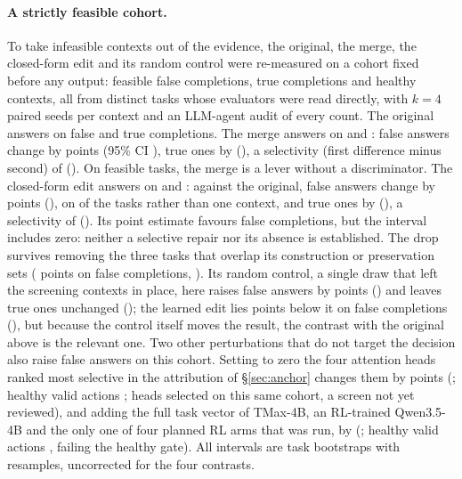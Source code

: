 \paragraph{A strictly feasible cohort.} To take infeasible contexts out of the evidence, the original, the merge, the closed-form edit and its random control were re-measured on a cohort fixed before any output: \pwOrigTasks{} feasible false completions, \pwFsm{} true completions and \pwHealthy{} healthy contexts, all from distinct tasks whose evaluators were read directly, with $k=4$ paired seeds per context and an LLM-agent audit of every count. %
The original answers on \pwOrigFsp{} false and \pwOrigFsm{} true completions. The merge answers on \pwCuaFsp{} and \pwCuaFsm: false answers change by \pwCuaDeltaFsp{} points (95\% CI \pwCuaCiFsp), true ones by \pwCuaDeltaFsm{} (\pwCuaCiFsm), a selectivity (first difference minus second) of \pwCuaSel{} (\pwCuaSelCi). On feasible tasks, the merge is a lever without a discriminator. The closed-form edit answers on \pwBroadFsp{} and \pwBroadFsm: against the original, false answers change by \pwBroadDeltaFsp{} points (\pwBroadCiFsp), on \pwBroadFspDown{} of the \pwOrigTasks{} tasks rather than one context, and true ones by \pwBroadDeltaFsm{} (\pwBroadCiFsm), a selectivity of \pwBroadSel{} (\pwBroadSelCi). Its point estimate favours false completions, but the interval includes zero: neither a selective repair nor its absence is established. The drop survives removing the three tasks that overlap its construction or preservation sets (\pwBroadSensDeltaFsp{} points on \pwSensFsp{} false completions, \pwBroadSensCiFsp). Its random control, a single draw that left the screening contexts in place, here raises false answers by \pwRandDeltaFsp{} points (\pwRandCiFsp) and leaves true ones unchanged (\pwRandDeltaFsm); the learned edit lies \pwBroadVsRandDeltaFsp{} points below it on false completions (\pwBroadVsRandCiFsp), but because the control itself moves the result, the contrast with the original above is the relevant one. Two other perturbations that do not target the decision also raise false answers on this cohort. Setting to zero the four attention heads ranked most selective in the attribution of \S\ref{sec:anchor} changes them by \mlZeroFsp{} points (\mlZeroFspCi; healthy valid actions \mlZeroHealthy; heads selected on this same cohort, a screen not yet reviewed), and adding the full task vector of TMax-4B, an RL-trained Qwen3.5-4B and the only one of four planned RL arms that was run, by \rlFsp{} (\rlFspCi; healthy valid actions \rlHealthy, failing the healthy gate). %
All intervals are task bootstraps with \pwBootReps{} resamples, uncorrected for the four contrasts.

